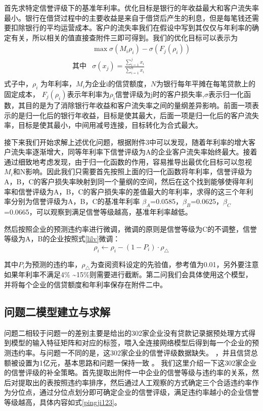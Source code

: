 \documentclass{cumcmthesis}
\begin{document}
首先求特定信誉评级下的基准年利率。优化目标是银行的年收益最大和客户流失率最小。银行在借贷过程中的主要收益是来自于借贷后产生的利息，但是每笔钱还需要扣除银行的平均运营成本。客户的流失率我们在假设中写到其仅仅与年利率的确定有关，所以相关的值直接查附件三即可得到。我们的优化目标可以表示为
\begin{equation}
    \begin{split}
    & \max \sigma(M_i \rho_i) - \sigma(F_j(\rho_i))
    \\
    \mbox{其中} &  \sigma(x_j) = \frac{\sum_{i=1}^{j}x_i}{\sum_{i=1}^{n}x_i} \\
    \end{split}
    \label{equalong2}
\end{equation}
式子中，$\rho_i$ 为年利率，$M_i$为企业i的信贷额度，$N$为银行每年平摊在每笔贷款上的固定成本，
$F_j(\rho_i)$表示年利率为$\rho_i$信誉评级为j时的客户损失率,$\sigma$表示归一化函数，其目的是为了消除银行年收益和客户流失率之间的量纲差异影响。前面一项表示的是归一化后的银行年收益，目标是使其最大，后面一项是归一化后的客户流失率，目标是使其最小，中间用减号连接，目标转化为合式最大。

接下来我们开始求解上述优化问题，根据附件3中可以发现，随着年利率的增大客户流失率逐渐增大，同等年利率下信誉评级为A的企业客户流失率始终最大。接着通过细致地考虑发现，由于归一化函数的作用，容易推导出最优化目标可以忽视$M_i$和N影响。因此我们只需要首先按照上面的归一化函数将年利率，信誉评级为A，B，C的客户损失率映射到同一个量纲的空间，然后在这个找到能够使得年利率和信誉评级为A，B，C的客户损失率的差值最大的年利率，求得的这三个年利率分别为信誉评级为A，B，C的基准年利率
$\beta_A$=0.0585，$\beta_B$=0.0625，$\beta_C$=0.0665，可以观察到满足信誉等级越高，基准年利率越低。

然后按照企业的预测违约率进行微调，微调的原则是信誉等级为C的不调整，信誉等级为A，B的企业按照式\ref{lilv}微调：
\begin{equation}
    \rho_i \gets \rho_i - (1 - P_i) \cdot \rho_\triangle
    \label{lilv}
\end{equation}

其中$P_i$为预测的违约率，$\rho_\triangle$为查阅资料设定的先验值，参考值为0.01，另外要注意如果年利率不满足4\% \textasciitilde 15\%则需要进行截断。第二问我们会具体使用这个模型，并将每个企业的信贷额度和年利率保存在附件二中。

\subsection{问题二模型建立与求解}
问题二相较于问题一的差别主要是给出的302家企业没有贷款记录据预处理方式得到模型的输入特征矩阵和对应的标签，喂入全连接网络模型后得到每一个企业的预测违约率。与问题一不同的是，这302家企业的信誉评级数据缺失。
，并且信贷总额被设置为1亿元，基本思路和问题一保持一致 。
我们这里介绍一下这302家企业的信誉评级的补全策略。首先提取出附件一中企业的信誉等级与违约率的关系，然后对提取出的表按照违约率排序，然后通过人工观察的方式确定三个合适违约率作为分位点，通过分位点划分即可确定企业的信誉评级，满足违约率越小的企业信誉等级越高，具体内容如式\ref{pingji123}。
\end{document}
